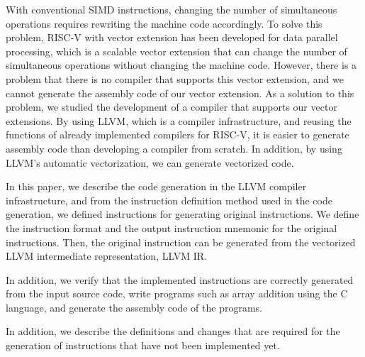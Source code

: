 With conventional SIMD instructions, changing the number of simultaneous operations requires rewriting the machine code accordingly.
To solve this problem, RISC-V with vector extension has been developed for data parallel processing, which is a scalable vector extension that can change the number of simultaneous operations without changing the machine code.
However, there is a problem that there is no compiler that supports this vector extension, and we cannot generate the assembly code of our vector extension. As a solution to this problem, we studied the development of a compiler that supports our vector extensions. By using LLVM, which is a compiler infrastructure, and reusing the functions of already implemented compilers for RISC-V, it is easier to generate assembly code than developing a compiler from scratch. In addition, by using LLVM's automatic vectorization, we can generate vectorized code.

In this paper, we describe the code generation in the LLVM compiler infrastructure, and from the instruction definition method used in the code generation, we defined instructions for generating original instructions. We define the instruction format and the output instruction mnemonic for the original instructions. Then, the original instruction can be generated from the vectorized LLVM intermediate representation, LLVM IR.

In addition, we verify that the implemented instructions are correctly generated from the input source code, write programs such as array addition using the C language, and generate the assembly code of the programs.

In addition, we describe the definitions and changes that are required for the generation of instructions that have not been implemented yet.